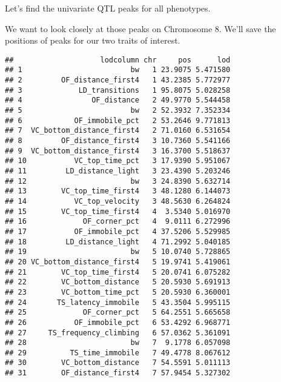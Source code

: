 \documentclass{book}
\newenvironment{Shaded}{\begin{snugshade}}{\end{snugshade}}
\newcommand{\DataTypeTok}[1]{\textcolor[rgb]{0.13,0.29,0.53}{#1}}
\newcommand{\DecValTok}[1]{\textcolor[rgb]{0.00,0.00,0.81}{#1}}
\newcommand{\KeywordTok}[1]{\textcolor[rgb]{0.13,0.29,0.53}{\textbf{#1}}}
\newcommand{\NormalTok}[1]{#1}
\newcommand{\OperatorTok}[1]{\textcolor[rgb]{0.81,0.36,0.00}{\textbf{#1}}}
\newcommand{\StringTok}[1]{\textcolor[rgb]{0.31,0.60,0.02}{#1}}
\begin{document}
Let's find the univariate QTL peaks for all phenotypes.

We want to look closely at those peaks on Chromosome 8. We'll save the
positions of peaks for our two traits of interest.

\begin{Shaded}
\end{Shaded}

\begin{verbatim}
##                    lodcolumn chr     pos      lod
## 1                         bw   1 23.9075 5.471580
## 2         OF_distance_first4   1 43.2385 5.772977
## 3             LD_transitions   1 95.8075 5.028258
## 4                OF_distance   2 49.9770 5.544458
## 5                         bw   2 52.3932 7.352334
## 6            OF_immobile_pct   2 53.2646 9.771813
## 7  VC_bottom_distance_first4   2 71.0160 6.531654
## 8         OF_distance_first4   3 10.7360 5.541166
## 9  VC_bottom_distance_first4   3 16.3700 5.518637
## 10           VC_top_time_pct   3 17.9390 5.951067
## 11         LD_distance_light   3 23.4390 5.203246
## 12                        bw   3 24.8390 5.632714
## 13        VC_top_time_first4   3 48.1280 6.144073
## 14           VC_top_velocity   3 48.5630 6.264824
## 15        VC_top_time_first4   4  3.5340 5.016970
## 16             OF_corner_pct   4  9.0111 6.272996
## 17           OF_immobile_pct   4 37.5206 5.529985
## 18         LD_distance_light   4 71.2992 5.040185
## 19                        bw   5 10.0740 5.728865
## 20 VC_bottom_distance_first4   5 19.9741 5.419061
## 21        VC_top_time_first4   5 20.0741 6.075282
## 22        VC_bottom_distance   5 20.5930 5.691913
## 23        VC_bottom_time_pct   5 20.5930 6.360001
## 24       TS_latency_immobile   5 43.3504 5.995115
## 25             OF_corner_pct   5 64.2551 5.665658
## 26           OF_immobile_pct   6 53.4292 6.968771
## 27     TS_frequency_climbing   6 57.0362 5.361091
## 28                        bw   7  9.1778 6.057098
## 29          TS_time_immobile   7 49.4778 8.067612
## 30        VC_bottom_distance   7 54.5591 5.011113
## 31        OF_distance_first4   7 57.9454 5.327302

\end{verbatim}
\end{document}
